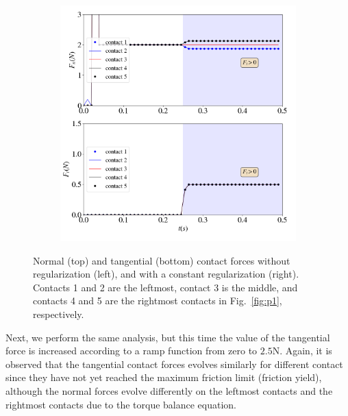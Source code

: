 \begin{itemize}
\begin{figure}[H]
\begin{subfigure}{0.48\columnwidth}
			\includegraphics[width=1.\textwidth]{images/CD/stick_reg.png}
		\end{subfigure}	
		\caption{Normal (top) and tangential (bottom) contact forces without regularization (left), and with a constant regularization (right). Contacts 1 and 2 are the leftmost, contact 3 is the middle, and contacts 4 and 5 are the rightmost contacts in Fig.~\ref{fig:p1}, respectively. }\label{fig:stick}
	\end{figure}
	Next, we perform the same analysis, but this time the value of the tangential force is increased according to a ramp function from zero to $2.5$\si{N}. Again, it is observed that the tangential contact forces evolves similarly for different contact since they have not yet reached the maximum friction limit (friction yield), although the normal forces evolve differently on the leftmost contacts and the rightmost contacts due to the torque balance equation.
	\begin{figure}[H]
		\centering	
		\begin{subfigure}{0.48\columnwidth}	
			\centering

\end{subfigure}
\end{figure}
\end{itemize}
